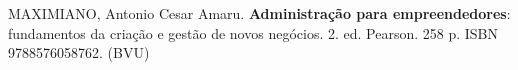 \begin{pud}
\begin{bibcomplementar}
         \item MAXIMIANO, Antonio Cesar Amaru. \textbf{Administração para empreendedores}: fundamentos da criação e gestão de novos negócios. 2. ed. Pearson.  258 p. ISBN 9788576058762.  (BVU) %

	\end{bibcomplementar}
	
		
\end{pud}





